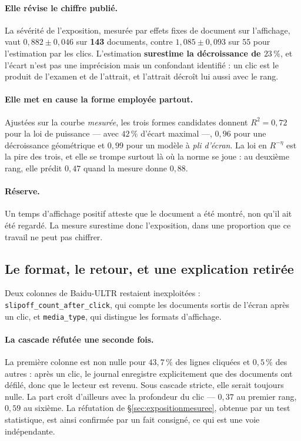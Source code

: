 \documentclass[11pt,a4paper]{article}
\begin{document}
\paragraph{Elle révise le chiffre publié.} La sévérité de l'exposition, mesurée par effets fixes de
document sur l'affichage, vaut $0{,}882 \pm 0{,}046$ sur \textbf{143} documents, contre
$1{,}085 \pm 0{,}093$ sur $55$ pour l'estimation par les clics. L'estimation \textbf{surestime la
décroissance de $23\,\%$}, et l'écart n'est pas une imprécision mais un confondant identifié : un
clic est le produit de l'examen et de l'attrait, et l'attrait décroît lui aussi avec le rang.

\paragraph{Elle met en cause la forme employée partout.} Ajustées sur la courbe \emph{mesurée},
les trois formes candidates donnent $R^2 = 0{,}72$ pour la loi de puissance --- avec $42\,\%$
d'écart maximal ---, $0{,}96$ pour une décroissance géométrique et $0{,}99$ pour un modèle à
\emph{pli d'écran}. La loi en $R^{-\eta}$ est la pire des trois, et elle se trompe surtout là où la
norme se joue : au deuxième rang, elle prédit $0{,}47$ quand la mesure donne $0{,}88$.

\paragraph{Réserve.} Un temps d'affichage positif atteste que le document a été montré, non qu'il
ait été regardé. La mesure surestime donc l'exposition, dans une proportion que ce travail ne peut
pas chiffrer.


\subsection{Le format, le retour, et une explication retirée}
\label{sec:formatretour}

Deux colonnes de Baidu-ULTR restaient inexploitées : \texttt{slipoff\_count\_after\_click}, qui
compte les documents sortis de l'écran après un clic, et \texttt{media\_type}, qui distingue les
formats d'affichage.

\paragraph{La cascade réfutée une seconde fois.} La première colonne est non nulle pour
$43{,}7\,\%$ des lignes cliquées et $0{,}5\,\%$ des autres : après un clic, le journal enregistre
explicitement que des documents ont défilé, donc que le lecteur est revenu. Sous cascade stricte,
elle serait toujours nulle. La part croît d'ailleurs avec la profondeur du clic --- $0{,}37$ au
premier rang, $0{,}59$ au sixième. La réfutation de \S\ref{sec:expositionmesuree}, obtenue par un
test statistique, est ainsi confirmée par un fait consigné, ce qui est une voie indépendante.
\end{document}
